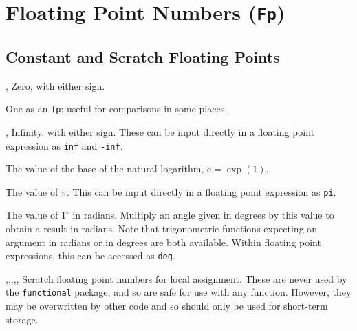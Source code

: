 \documentclass[oneside]{book}
\begin{document}
\chapter{Floating Point Numbers (\texttt{Fp})}

\section{Constant and Scratch Floating Points}

\begin{variable}{\cZeroFp, \cMinusZeroFp}
Zero, with either sign.
\end{variable}

\begin{variable}{\cOneFp}
One as an \texttt{fp}: useful for comparisons in some places.
\end{variable}

\begin{variable}{\cInfFp,\cMinusInfFp}
Infinity, with either sign. These can be input directly in a
floating point expression as \texttt{inf} and \texttt{-inf}.
\end{variable}

\begin{variable}{\cEFp}
The value of the base of the natural logarithm, $\mathrm{e} = \exp(1)$.
\end{variable}

\begin{variable}{\cPiFp}
The value of $\pi$.  This can be input directly in a floating point
expression as \texttt{pi}.
\end{variable}

\begin{variable}{\cOneDegreeFp}
The value of $1^{\circ}$ in radians. Multiply an angle given in
degrees by this value to obtain a result in radians.  Note that
trigonometric functions expecting an argument in radians or in
degrees are both available.  Within floating point expressions, this
can be accessed as \texttt{deg}.
\end{variable}

\begin{variable}{\lTmpaFp,\lTmpbFp,\lTmpcFp,\lTmpiFp,\lTmpjFp,\lTmpkFp}
Scratch floating point numbers for local assignment. These are never used by
the \verb!functional! package, and so are safe for use with any
function. However, they may be overwritten by other
code and so should only be used for short-term storage.
\end{variable}
\end{document}
